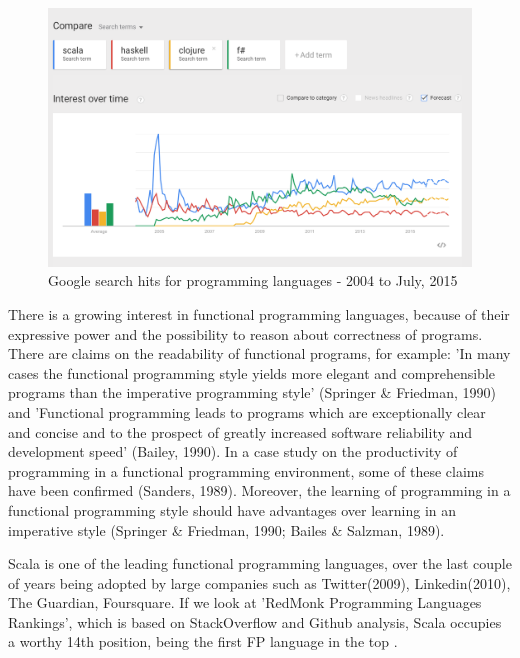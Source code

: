 \documentclass{article}
\begin{document}
\begin{figure}[h!]
  \includegraphics[width=\linewidth]{google-trends.png}
  \caption{Google search hits for programming languages - 2004 to July, 2015 }
  \label{fig:google-rank}
\end{figure}
There is a growing interest in functional programming languages, because of their expressive power and the possibility to reason about correctness of programs. There are claims on the readability of functional programs, for example: 'In many cases the functional programming style yields more elegant and comprehensible programs than the imperative programming style' (Springer \& Friedman, 1990) and 'Functional programming leads to programs which are exceptionally clear and concise and to the prospect of greatly increased software reliability and development speed' (Bailey, 1990). In a case study on the productivity of programming in a functional programming environment, some of these claims have been confirmed (Sanders, 1989).
Moreover, the learning of programming in a functional programming style should have advantages over learning in an imperative style (Springer \& Friedman, 1990; Bailes \& Salzman, 1989). \cite{DBLP:journals/infsof/BergB95} \par

Scala is one of the leading functional programming languages, over the last couple of years being adopted by large companies such as  Twitter(2009), Linkedin(2010), The Guardian, Foursquare. If we look at 'RedMonk Programming Languages Rankings'\cite{redmonk:1}, which is based on StackOverflow and Github analysis,  Scala occupies a worthy 14th position, being the first FP language in the top . \par
\end{document}
